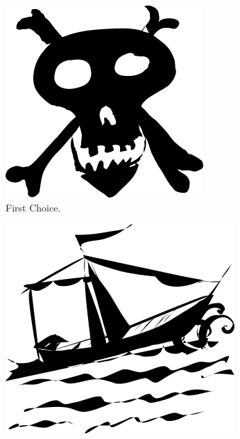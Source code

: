 \documentclass{article}
\begin{document}
\begin{figure}[H]
  \centering
   \begin{subfigure}[b]{0.3\linewidth}
    \includegraphics[width=\linewidth]{resources/pirates1.png}
    \caption{First Choice.}
  \end{subfigure}
  \begin{subfigure}[b]{0.3\linewidth}
    \includegraphics[width=\linewidth]{resources/pirates2.png}

\end{subfigure}
\end{figure}
\end{document}
